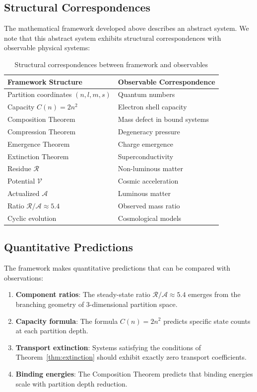 \documentclass[twocolumn,10pt,a4paper]{article}
\theoremstyle{definition}
\theoremstyle{remark}
\newcommand{\Residue}{\mathcal{R}}
\newcommand{\Potential}{\mathcal{V}}
\begin{document}
\subsection{Structural Correspondences}

The mathematical framework developed above describes an abstract system. We note that this abstract system exhibits structural correspondences with observable physical systems:

\begin{table}[h]
\centering
\caption{Structural correspondences between framework and observables}
\label{tab:correspondences}
\begin{tabular}{ll}
\toprule
\textbf{Framework Structure} & \textbf{Observable Correspondence} \\
\midrule
Partition coordinates $(n,l,m,s)$ & Quantum numbers \\
Capacity $C(n) = 2n^2$ & Electron shell capacity \\
Composition Theorem & Mass defect in bound systems \\
Compression Theorem & Degeneracy pressure \\
Emergence Theorem & Charge emergence \\
Extinction Theorem & Superconductivity \\
Residue $\Residue$ & Non-luminous matter \\
Potential $\Potential$ & Cosmic acceleration \\
Actualized $\mathcal{A}$ & Luminous matter \\
Ratio $\Residue/\mathcal{A} \approx 5.4$ & Observed mass ratio \\
Cyclic evolution & Cosmological models \\
\bottomrule
\end{tabular}
\end{table}

\subsection{Quantitative Predictions}

The framework makes quantitative predictions that can be compared with observations:

\begin{enumerate}
    \item \textbf{Component ratios}: The steady-state ratio $\Residue/\mathcal{A} \approx 5.4$ emerges from the branching geometry of 3-dimensional partition space.

    \item \textbf{Capacity formula}: The formula $C(n) = 2n^2$ predicts specific state counts at each partition depth.

    \item \textbf{Transport extinction}: Systems satisfying the conditions of Theorem~\ref{thm:extinction} should exhibit exactly zero transport coefficients.

    \item \textbf{Binding energies}: The Composition Theorem predicts that binding energies scale with partition depth reduction.
\end{enumerate}
\end{document}
